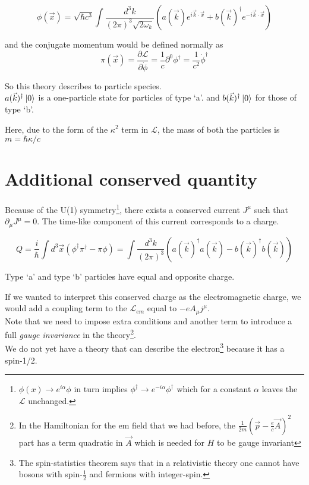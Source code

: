 \documentclass[11pt]{article}
\newcommand{\lag}{\mathcal{L}}
\begin{document}
	\[ \phi (\vec{x}) = \sqrt{\hbar c^3} \int \frac{d^3 k }{(2\pi)^3 \sqrt{2\omega_k}} \left( a(\vec{k}) e^{i\vec{k}\cdot \vec{x}} + b(\vec{k}) ^\dagger e^{-i\vec{k}\cdot \vec{x}} \right)\]
	
	and the conjugate momentum would be defined normally as 
	\[ \pi(\vec{x}) = \frac{\partial \lag}{\partial \dot{\phi}} = \frac{1}{c} \partial^0 \phi^\dagger = \frac{1}{c^2} \dot{\phi}^\dagger \]
	
	So this theory describes to particle species.\\ $a(\vec{k})^\dagger \ket{0}$ is a one-particle state for particles of type `a'. and $b(\vec{k})^\dagger \ket{0}$ for those of type `b'.
	
	Here, due to the form of the $\kappa^2$ term in $\lag$, the mass of both the particles is $m = \hbar \kappa/c$
	
	\section*{Additional conserved quantity}
	
	Because of the U(1) symmetry\footnote{$\phi(x) \rightarrow e^{i\alpha} \phi$ in turn implies $\phi^\dagger \rightarrow e^{-i\alpha} \phi^\dagger$ which for a constant $\alpha$ leaves the $\lag$ unchanged.}, there exists a conserved current $J^\mu$ such that $\partial_\mu J^\mu = 0$. The time-like component of this current corresponds to a charge.
	
	
	\[ Q = \frac{i}{\hbar} \int d^3 \vec{x} \left( \phi^\dagger \pi^\dagger - \pi \phi \right) = \int \frac{d^3 k}{(2\pi)^3} \left( a(\vec{k})^\dagger a(\vec{k}) - b(\vec{k})^\dagger b(\vec{k}) \right)\]
	
	Type `a' and type `b' particles have equal and opposite charge.
	
	If we wanted to interpret this conserved charge as the electromagnetic charge, we would add a coupling term to the $\lag_{em}$ equal to $-eA_\mu j^\mu$.\\
	
	Note that we need to impose extra conditions and another term to introduce a full {\it gauge invariance} in the theory\footnote{In the Hamiltonian for the em field that we had before, the $\frac{1}{2m} \left( \vec{p} - \frac{e}{c}\vec{A}\right)^2$ part has a term quadratic in $\vec{A}$ which is needed for $H$ to be gauge invariant}.\\
	
	
	We do not yet have a theory that can describe the electron\footnote{The spin-statistics theorem says that in a relativistic theory one cannot have bosons with spin-$\frac{1}{2}$ and fermions with integer-spin.} because it has a spin-1/2. 
	
\end{document}
